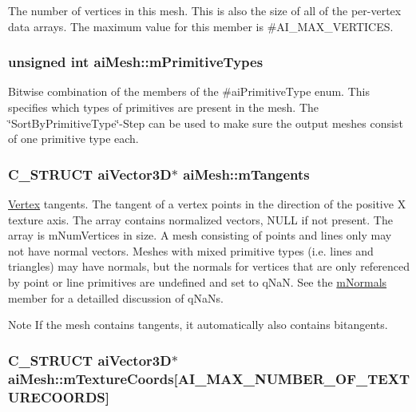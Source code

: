 The number of vertices in this mesh. This is also the size of all of the per-\/vertex data arrays. The maximum value for this member is \#\+A\+I\+\_\+\+M\+A\+X\+\_\+\+V\+E\+R\+T\+I\+C\+E\+S. \hypertarget{structai_mesh_a99d66ac0a444068c1b252b30265cbf53}{
\subsubsection[{m\+Primitive\+Types}]{\setlength{\rightskip}{0pt plus 5cm}unsigned int ai\+Mesh\+::m\+Primitive\+Types}}\label{structai_mesh_a99d66ac0a444068c1b252b30265cbf53}
Bitwise combination of the members of the \#ai\+Primitive\+Type enum. This specifies which types of primitives are present in the mesh. The \char`\"{}\+Sort\+By\+Primitive\+Type\char`\"{}-\/\+Step can be used to make sure the output meshes consist of one primitive type each. \hypertarget{structai_mesh_af367ff78bd69f3e83d7edc8ad67dc5df}{
\subsubsection[{m\+Tangents}]{\setlength{\rightskip}{0pt plus 5cm}C\+\_\+\+S\+T\+R\+U\+C\+T {\bf ai\+Vector3\+D}$\ast$ ai\+Mesh\+::m\+Tangents}}\label{structai_mesh_af367ff78bd69f3e83d7edc8ad67dc5df}
\hyperlink{struct_vertex}{Vertex} tangents. The tangent of a vertex points in the direction of the positive X texture axis. The array contains normalized vectors, N\+U\+L\+L if not present. The array is m\+Num\+Vertices in size. A mesh consisting of points and lines only may not have normal vectors. Meshes with mixed primitive types (i.\+e. lines and triangles) may have normals, but the normals for vertices that are only referenced by point or line primitives are undefined and set to q\+Na\+N. See the \hyperlink{structai_mesh_aec81b496b4d93838cef038933dabe9b9}{m\+Normals} member for a detailled discussion of q\+Na\+Ns. \begin{DoxyNote}{Note}
If the mesh contains tangents, it automatically also contains bitangents. 
\end{DoxyNote}
\hypertarget{structai_mesh_a4a50b11d00ef50f419c75cab0f6bddd6}{
\subsubsection[{m\+Texture\+Coords}]{\setlength{\rightskip}{0pt plus 5cm}C\+\_\+\+S\+T\+R\+U\+C\+T {\bf ai\+Vector3\+D}$\ast$ ai\+Mesh\+::m\+Texture\+Coords\mbox{[}A\+I\+\_\+\+M\+A\+X\+\_\+\+N\+U\+M\+B\+E\+R\+\_\+\+O\+F\+\_\+\+T\+E\+X\+T\+U\+R\+E\+C\+O\+O\+R\+D\+S\mbox{]}}}\label{structai_mesh_a4a50b11d00ef50f419c75cab0f6bddd6}
